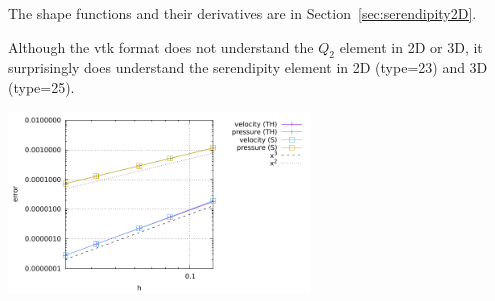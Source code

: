 The shape functions and their derivatives are in Section~\ref{sec:serendipity2D}.

Although the vtk format does not understand the $Q_2$ element in 2D or 3D, it surprisingly does
understand the serendipity element in 2D (type=23) and 3D (type=25).

\begin{center}
\includegraphics[width=8cm]{python_codes/fieldstone_52/errors.pdf}
\end{center}


